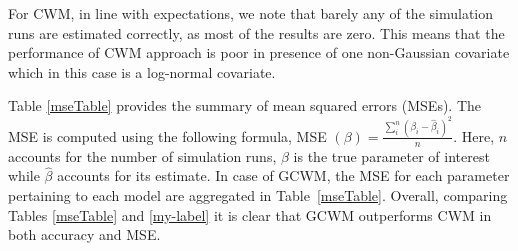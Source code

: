 \documentclass[12pt,letterpaper]{article}
\numberwithin{equation}{section}
\numberwithin{equation}{section}
\numberwithin{equation}{section}
\begin{document}
For CWM, in line with expectations, we note that barely any of the simulation runs are estimated correctly, as most of the results are zero. This means that the performance of CWM approach is poor in presence of one non-Gaussian covariate which in this case is a log-normal covariate. 

Table \ref{mseTable} provides the summary of mean squared errors (MSEs). The MSE is computed using the following formula, MSE $(\beta) = \frac{\sum_i^n (\beta_i - \hat\beta_i ) ^2}{n}$. Here, $n$ accounts for the number of simulation runs, $\beta$ is the true parameter of interest while $\hat{\beta}$ accounts for its estimate. In case of GCWM, the MSE for each parameter pertaining to each model are aggregated in Table~\ref{mseTable}. 
Overall, comparing Tables \ref{mseTable} and \ref{my-label} it is clear that GCWM outperforms CWM in both accuracy and MSE. 
\end{document}
